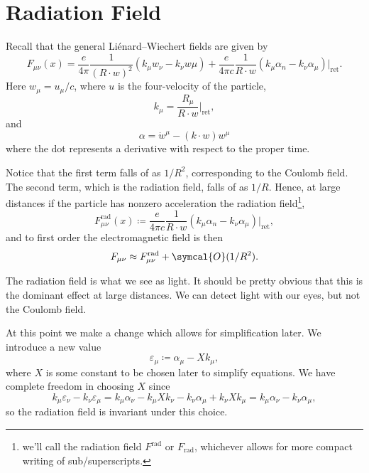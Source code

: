 \documentclass[fleqn]{NotesClass}
\newcommand*{\order}{\symcal{O}}
\newcommand*{\ret}{{\text{ret}}}
\newcommand*{\rad}{\text{rad}}
\begin{document}
    \section{Radiation Field}
    Recall that the general Li\'enard–Wiechert fields are given by
    \begin{equation}
        F_{\mu\nu}(x) = \frac{e}{4\pi} \frac{1}{(R \cdot w)^2} (k_\mu w_\nu - k_\nu w\mu) + \frac{e}{4\pi c} \frac{1}{R \cdot w} (k_\mu \alpha_n - k_\nu \alpha_\mu) \bigg|_{\ret}.
    \end{equation}
    Here \(w_\mu = u_\mu/c\), where \(u\) is the four-velocity of the particle,
    \begin{equation}
        k_\mu = \frac{R_\mu}{R \cdot w} \bigg|_{\ret},
    \end{equation}
    and
    \begin{equation}
        \alpha = \dot{w}^\mu - (k \cdot w) w^\mu
    \end{equation}
    where the dot represents a derivative with respect to the proper time.
    
    Notice that the first term falls of as \(1/R^2\), corresponding to the Coulomb field.
    The second term, which is the radiation field, falls of as \(1/R\).
    Hence, at large distances if the particle has nonzero acceleration the radiation field\footnote{we'll call the radiation field \(F^{\rad}\) or \(F_{\rad}\), whichever allows for more compact writing of sub/superscripts.},
    \begin{equation}
        F_{\mu\nu}^{\rad}(x) \coloneqq \frac{e}{4\pi c} \frac{1}{R \cdot w} (k_\mu \alpha_n - k_\nu \alpha_\mu) \bigg|_{\ret},
    \end{equation}
    and to first order the electromagnetic field is then
    \begin{equation}
        F_{\mu\nu} \approx F_{\mu\nu}^{\rad} + \order(1/R^2).
    \end{equation}
    
    The radiation field is what we see as light.
    It should be pretty obvious that this is the dominant effect at large distances.
    We can detect light with our eyes, but not the Coulomb field.
    
    At this point we make a change which allows for simplification later.
    We introduce a new value
    \begin{equation}
        \varepsilon_\mu \coloneqq \alpha_\mu - Xk_\mu,
    \end{equation}
    where \(X\) is some constant to be chosen later to simplify equations.
    We have complete freedom in choosing \(X\) since
    \begin{equation}
        k_\mu \varepsilon_\nu - k_\nu \varepsilon_\mu = k_\mu \alpha_\nu - k_\mu X k_\nu - k_\nu \alpha_\mu + k_\nu X k_\mu = k_\mu \alpha_\nu - k_\nu \alpha_\mu,
    \end{equation}
    so the radiation field is invariant under this choice.
    
\end{document}
